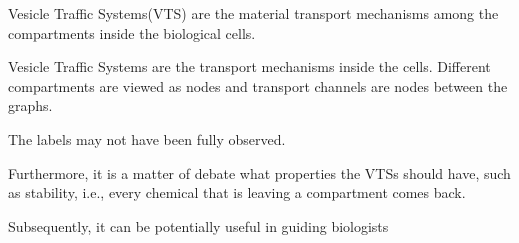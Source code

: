 Vesicle Traffic Systems(VTS) are the material transport mechanisms
among the compartments inside the biological cells.\cite{vtsIntro}
%


Vesicle Traffic Systems are the transport mechanisms inside the cells.
%
Different compartments are viewed as nodes and transport channels are
nodes between the graphs.

%
The labels may not have been fully observed.

Furthermore, it is a matter of debate what properties
the VTSs should have, such as stability, i.e., every
chemical that is leaving a compartment comes back.


Subsequently, it can be potentially useful in guiding biologists


